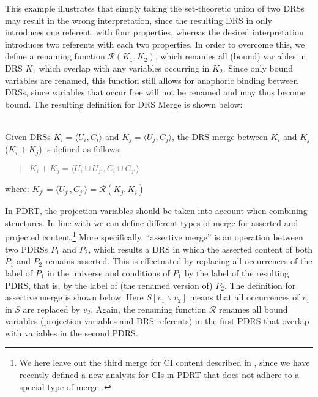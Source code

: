 \noindent This example illustrates that simply taking the set-theoretic
union of two DRSs may result in the wrong interpretation, since the
resulting DRS in \Last only introduces one referent, with four properties,
whereas the desired interpretation introduces two referents with each two
properties. In order to overcome this, we define a renaming function
$\mathcal{R}(K_1,K_2)$, which renames all (bound) variables in DRS $K_1$
which overlap with any variables occurring in $K_2$. %
Since only bound variables are renamed, this function still allows for
anaphoric binding between DRSs, since variables that occur free will not be
renamed and may thus become bound. The resulting definition for DRS Merge is
shown below:

\begin{definition}~\\
Given DRSs $K_i=\langle U_i,C_i \rangle$ and $K_j=\langle U_j,C_j \rangle$,
the DRS merge between $K_i$ and $K_j$ ($K_i + K_j$) is defined as follows:
  \begin{quote}
    $K_i + K_j = 
    \langle U_i\cup U_{j'},C_i \cup C_{j'}\rangle$
  \end{quote}
  where: $K_{j'} = \langle U_{j'},C_{j'} \rangle = \mathcal{R}(K_j,K_i)$
\end{definition}

In PDRT, the projection variables should be taken into account when
combining structures.  In line with  we can
define different types of merge for asserted and projected
content.\footnote{We here leave out the third merge for CI content described
in , since we have recently defined a new
analysis for CIs in PDRT that does not adhere to a special type of merge
\cite{venhuizenInPrepSALT}.} More specifically, ``assertive merge'' is an
operation between two PDRSs $P_1$ and $P_2$, which results a DRS in which
the asserted content of both $P_1$ and $P_2$ remains asserted. This is
effectuated by replacing all occurrences of the label of $P_1$ in the
universe and conditions of $P_1$ by the label of the resulting PDRS, that
is, by the label of (the renamed version of) $P_2$. The definition for
assertive merge is shown below. Here $S[v_1\backslash v_2]$ means that all
occurrences of $v_1$ in $S$ are replaced by $v_2$. Again, the renaming
function $\mathcal{R}$ renames all bound variables (projection variables and
DRS referents) in the first PDRS that overlap with variables in the second
PDRS.

